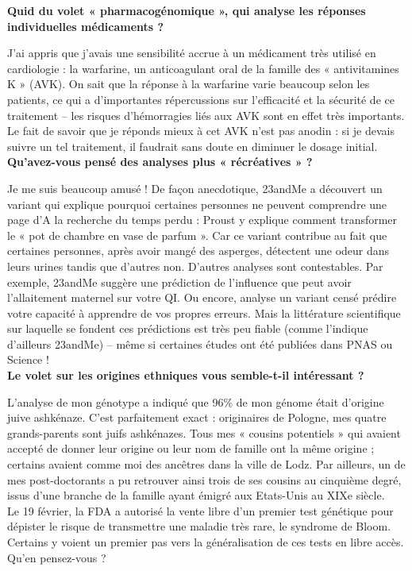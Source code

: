 \documentclass[8pt]{article}
\begin{document}
\textbf{Quid du volet « pharmacogénomique », qui analyse les réponses individuelles médicaments ?}

J’ai appris que j’avais une sensibilité accrue à un médicament très utilisé en cardiologie : la warfarine, un anticoagulant oral de la famille des « antivitamines K » (AVK). On sait que la réponse à la warfarine varie beaucoup selon les patients, ce qui a d’importantes répercussions sur l’efficacité et la sécurité de ce traitement – les risques d’hémorragies liés aux AVK sont en effet très importants. Le fait de savoir que je réponds mieux à cet AVK n’est pas anodin : si je devais suivre un tel traitement, il faudrait sans doute en diminuer le dosage initial.\\

\textbf{Qu’avez-vous pensé des analyses plus « récréatives » ?}

Je me suis beaucoup amusé ! De façon anecdotique, 23andMe a découvert un variant qui explique pourquoi certaines personnes ne peuvent comprendre une page d’A la recherche du temps perdu : Proust y explique comment transformer le « pot de chambre en vase de parfum ». Car ce variant contribue au fait que certaines personnes, après avoir mangé des asperges, détectent une odeur dans leurs urines tandis que d’autres non. D’autres analyses sont contestables. Par exemple, 23andMe suggère une prédiction de l’influence que peut avoir l’allaitement maternel sur votre QI. Ou encore, analyse un variant censé prédire votre capacité à apprendre de vos propres erreurs. Mais la littérature scientifique sur laquelle se fondent ces prédictions est très peu fiable (comme l’indique d’ailleurs 23andMe) – même si certaines études ont été publiées dans PNAS ou Science !\\

\textbf{Le volet sur les origines ethniques vous semble-t-il intéressant ?}

L’analyse de mon génotype a indiqué que 96\% de mon génome était d’origine juive ashkénaze. C’est parfaitement exact : originaires de Pologne, mes quatre grands-parents sont juifs ashkénazes. Tous mes « cousins potentiels » qui avaient accepté de donner leur origine ou leur nom de famille ont la même origine ; certains avaient comme moi des ancêtres dans la ville de Lodz. Par ailleurs, un de mes post-doctorants a pu retrouver ainsi trois de ses cousins au cinquième degré, issus d’une branche de la famille ayant émigré aux Etats-Unis au XIXe siècle. \\

Le 19 février, la FDA a autorisé la vente libre d’un premier test génétique pour dépister le risque de transmettre une maladie très rare, le syndrome de Bloom. Certains y voient un premier pas vers la généralisation de ces tests en libre accès. Qu’en pensez-vous ?\\
\end{document}
